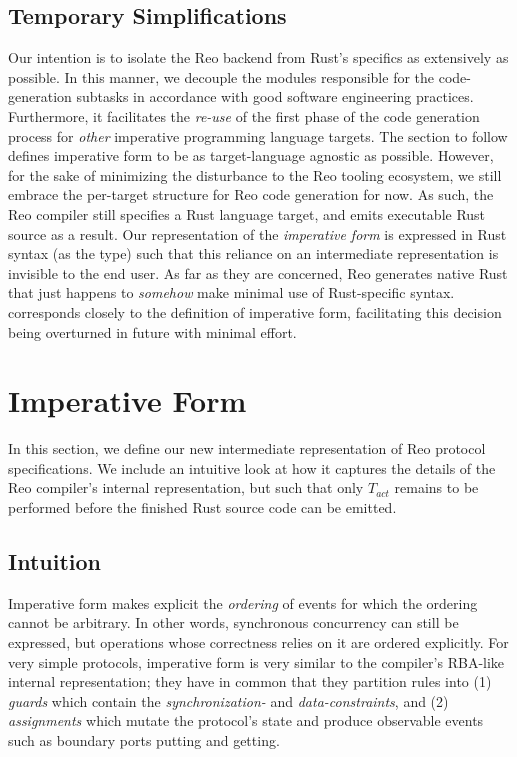 \subsection{Temporary Simplifications}
Our intention is to isolate the Reo backend from Rust's specifics as extensively as possible. In this manner, we decouple the modules responsible for the code-generation subtasks in accordance with good software engineering practices. Furthermore, it facilitates the \textit{re-use} of the first phase of the code generation process for \textit{other} imperative programming language targets. The section to follow defines imperative form to be as target-language agnostic as possible. However, for the sake of minimizing the disturbance to the Reo tooling ecosystem, we still embrace the per-target structure for Reo code generation for now. As such, the Reo compiler still specifies a Rust language target, and emits executable Rust source as a result. Our representation of the \textit{imperative form} is expressed in Rust syntax (as the  type) such that this reliance on an intermediate representation is invisible to the end user. As far as they are concerned, Reo generates native Rust that just happens to \textit{somehow} make minimal use of Rust-specific syntax.  corresponds closely to the definition of imperative form, facilitating this decision being overturned in future with minimal effort.


\section{Imperative Form}
\label{sec:imperative_form_sec}
In this section, we define our new intermediate representation of Reo protocol specifications. We include an intuitive look at how it captures the details of the Reo compiler's internal representation, but such that only $T_{act}$ remains to be performed before the finished Rust source code can be emitted.


\subsection{Intuition}
Imperative form makes explicit the \textit{ordering} of events for which the ordering cannot be arbitrary. In other words, synchronous concurrency can still be expressed, but operations whose correctness relies on it are ordered explicitly. For very simple protocols, imperative form is very similar to the compiler's RBA-like internal representation; they have in common that they partition rules into (1) \textit{guards} which contain the \textit{synchronization-} and \textit{data-constraints}, and (2) \textit{assignments} which mutate the protocol's state and produce observable events such as boundary ports putting and getting. 

